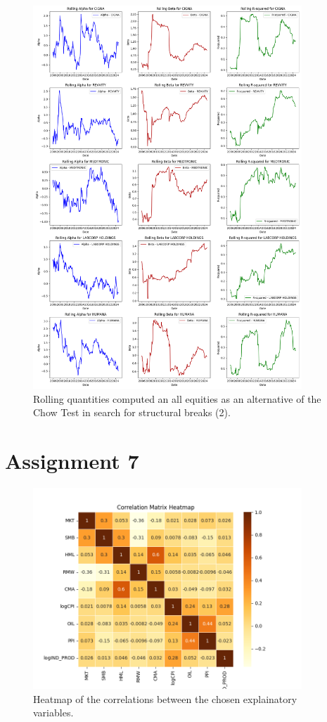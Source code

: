 \documentclass[12pt, openright, twoside]{report}
\begin{document}
\begin{figure}[h!]
    \centering
    \includegraphics[width=0.9\textwidth]{images/rolling_quantities_2.png}
    \caption{Rolling quantities computed an all equities as an alternative of the Chow Test in search for structural
    breaks (2).}\label{fig:rolling_quantities_2}
\end{figure}

\section*{Assignment 7}

\begin{figure}[h!]
    \centering
    \includegraphics[width=0.9\textwidth]{images/Correlation_heatmap.png}
    \caption{Heatmap of the correlations between the chosen explainatory variables.}\label{fig:Correlation_heatmap}
\end{figure}
\end{document}
